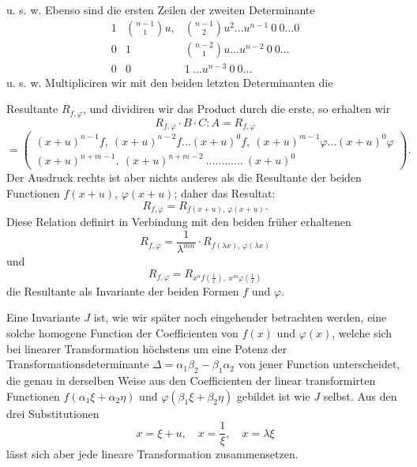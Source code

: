 \documentclass[11pt]{article}
\providecommand{\weberpage}[1]{}
\providecommand{\weq}[2]{\begin{equation}\tag{#1}#2\end{equation}}
\let\Delta\varDelta
\begin{document}
u. s. w. Ebenso sind die ersten Zeilen der zweiten Determinante
\[
\begin{array}{lll}
1 & \binom{n-1}{1}u, & \binom{n-1}{2}u^2\ldots u^{n-1}\ 0\ 0\ldots 0\\
0 & 1 & \binom{n-2}{1}u\ldots u^{n-2}\ 0\ 0\ldots\\
0 & 0 & 1\ \ldots u^{n-3}\ 0\ 0\ldots
\end{array}
\]
u. s. w. Multipliciren wir mit den beiden letzten Determinanten die


\weberpage{153}
Resultante $R_{f,\varphi}$, und dividiren wir das Product durch die
erste, so erhalten wir
\[
R_{f,\varphi}\cdot B\cdot C : A = R_{f,\varphi}
\]
\[
= \left(\begin{array}{l}
(x+u)^{n-1}f,\ (x+u)^{n-2}f\ldots(x+u)^0f,\ (x+u)^{m-1}\varphi\ldots(x+u)^0\varphi\\[2pt]
(x+u)^{n+m-1},\ (x+u)^{n+m-2}\ \ldots\ldots\ldots\ldots\ (x+u)^0
\end{array}\right).
\]
Der Ausdruck rechts ist aber nichts anderes als die Resultante der
beiden Functionen $f(x+u)$, $\varphi(x+u)$; daher das Resultat:
\weq{1}{R_{f,\varphi} = R_{f(x+u),\,\varphi(x+u)}.}
Diese Relation definirt in Verbindung mit den beiden fr\"uher
erhaltenen
\weq{2}{R_{f,\varphi} = \frac{1}{\lambda^{mn}}\cdot R_{f(\lambda x),\,\varphi(\lambda x)}}
und
\weq{3}{R_{f,\varphi} = R_{x^n f\left(\frac{1}{x}\right),\; x^m\varphi\left(\frac{1}{x}\right)}}
die Resultante als Invariante der beiden Formen $f$ und $\varphi$.

Eine Invariante $J$ ist, wie wir sp\"ater noch eingehender betrachten
werden, eine solche homogene Function der Coefficienten von $f(x)$ und
$\varphi(x)$, welche sich bei linearer Transformation h\"ochstens um
eine Potenz der Transformationsdeterminante
$\Delta = \alpha_1\beta_2 - \beta_1\alpha_2$ von jener Function
unterscheidet, die genau in derselben Weise aus den Coefficienten der
linear transformirten Functionen $f(\alpha_1\xi+\alpha_2\eta)$ und
$\varphi(\beta_1\xi+\beta_2\eta)$ gebildet ist wie $J$ selbst. Aus den
drei Substitutionen
\[
x = \xi + u,\quad x = \frac{1}{\xi},\quad x = \lambda\xi
\]
l\"asst sich aber jede lineare Transformation zusammensetzen.
\end{document}
